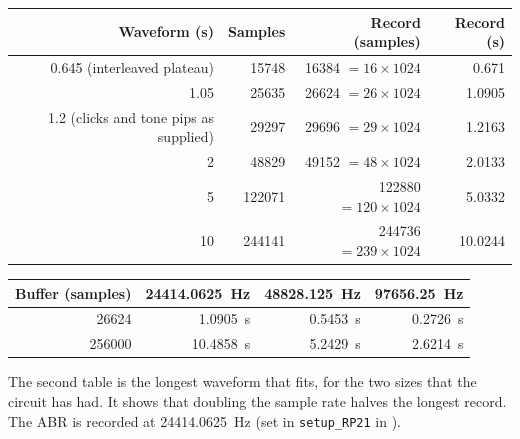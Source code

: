 \begin{center}
\begin{tabular}{@{}rrrr@{}}
\toprule
Waveform (s) & Samples & Record (samples) & Record (s) \\
\midrule
0.645 (interleaved plateau) & 15748 & 16384 $= 16 \times 1024$ & 0.671 \\
1.05 & 25635 & 26624 $= 26 \times 1024$ & 1.0905 \\
1.2 (clicks and tone pips as supplied) & 29297 & 29696 $= 29 \times 1024$ & 1.2163 \\
2 & 48829 & 49152 $= 48 \times 1024$ & 2.0133 \\
5 & 122071 & 122880 $= 120 \times 1024$ & 5.0332 \\
10 & 244141 & 244736 $= 239 \times 1024$ & 10.0244 \\
\bottomrule
\end{tabular}
\end{center}

\begin{center}
\begin{tabular}{@{}rrrr@{}}
\toprule
Buffer (samples) & 24414.0625~Hz & 48828.125~Hz & 97656.25~Hz \\
\midrule
26624 & 1.0905~s & 0.5453~s & 0.2726~s \\
256000 & 10.4858~s & 5.2429~s & 2.6214~s \\
\bottomrule
\end{tabular}
\end{center}
The second table is the longest waveform that fits, for the two sizes that the circuit has
had. It shows that doubling the sample rate halves the longest record. The ABR is recorded
at 24414.0625~Hz (set in \texttt{setup\_RP21} in ).

